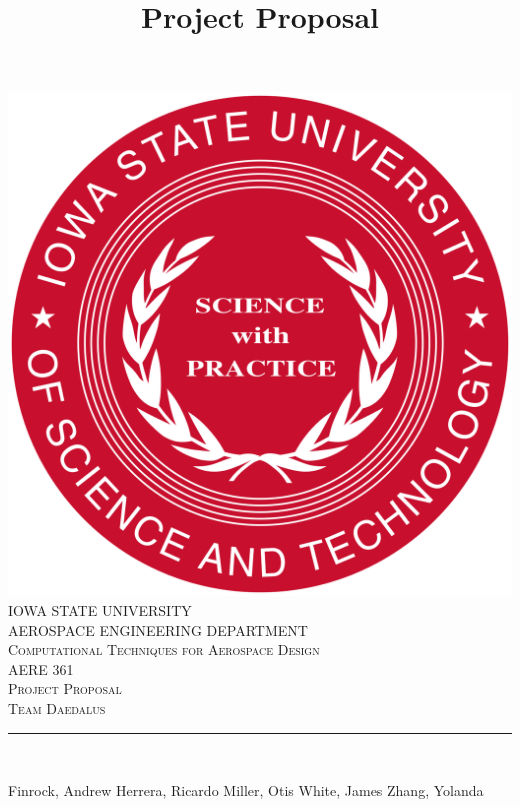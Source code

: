 \documentclass[12pt]{article}
\begin{document}
\title{Project Proposal}

\begin{titlepage}
	\centering
    \vspace*{0.5 cm}
    \includegraphics[scale = 0.11]{isu_seal.png}\\[1.0 cm]	%
    \textsc{\LARGE IOWA STATE UNIVERSITY}\\[2.0 cm]
    \textsc{\large AEROSPACE ENGINEERING DEPARTMENT}\\[0.2 cm]
    \textsc{\large Computational Techniques for Aerospace Design}\\[0.2 cm]
	\textsc{\Large AERE 361}\\[0.5 cm]				%
	\textsc{\Large Project Proposal}\\[0.2 cm]
	\textsc{\Large Team Daedalus}\\[0.2 cm]
	\rule{\linewidth}{0.2 mm} \\[0.4 cm]
	
	
	\begin{minipage}{0.8\textwidth}
		
			\begin{flushleft} 
			Finrock, Andrew\linebreak
			Herrera, Ricardo\linebreak
			Miller, Otis\linebreak
			White, James\linebreak
			Zhang, Yolanda\linebreak
			
		\end{flushleft}
	\end{minipage}\\[2 cm]
	
	\vfill
	
\end{titlepage}
\end{document}
